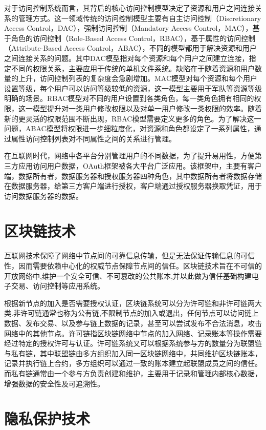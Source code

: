 对于访问控制系统而言，其背后的核心访问控制模型决定了资源和用户之间连接关系的管理方式。这一领域传统的访问控制模型主要有自主访问控制（Discretionary Access Control，DAC），强制访问控制（Mandatory Access Control，MAC），基于角色的访问控制（Role-Based Access Control，RBAC），基于属性的访问控制（Attribute-Based Access Control，ABAC），不同的模型都用于解决资源和用户之间连接关系的问题。其中DAC模型指对每个资源和每个用户之间建立连接，指定不同的权限关系，主要应用于传统的单机文件系统。缺陷在于随着资源和用户数量的上升，访问控制列表的复杂度会急剧增加。MAC模型对每个资源和每个用户设置等级，每个用户可以访问等级较低的资源，这一模型主要用于军队等资源等级明确的场景。RBAC模型对不同的用户设置到各类角色，每一类角色拥有相同的权限，这一模型提升对一类用户修改权限以及对单一用户修改一类权限的效率。随着新的更灵活的权限范围不断出现，RBAC模型需要定义更多的角色。为了解决这一问题，ABAC模型将权限进一步细粒度化，对资源和角色都设定了一系列属性，通过属性访问控制列表对不同属性之间的关系进行管理。

在互联网时代，网络中各平台分别管理用户的不同数据，为了提升易用性，方便第三方应用访问用户数据，OAuth框架被各大平台广泛应用。该框架中，主要有客户端，数据所有者，数据服务器和授权服务器四种角色，其中数据所有者将数据存储在数据服务器，给第三方客户端进行授权，客户端通过授权服务器换取凭证，用于访问数据服务器的数据。

\section{区块链技术}

互联网技术保障了网络中节点间的可靠信息传输，但是无法保证传输信息的可信性，因而需要依赖中心化的权威节点保障节点间的信任。区块链技术旨在不可信的开放网络中,维护一个安全可信、不可篡改的公共账本,并以此做为信任基础构建电子交易、访问控制等应用系统。

根据新节点的加入是否需要授权认证，区块链系统可以分为许可链和非许可链两大类.非许可链通常也称为公有链,不限制节点的加入或退出，任何节点可以访问链上数据、发布交易、以及参与链上数据的记录，甚至可以尝试发布不合法消息，攻击网络中的其他节点。许可链指区块链网络中节点的加入网络、记录账本等操作需要经过特定的授权许可与认证。许可链系统又可以根据系统参与方的数量分为联盟链与私有链，其中联盟链由多方组织加入同一区块链网络中，共同维护区块链账本，记录并执行链上合约，多方组织可以通过一致的账本建立起联盟成员之间的信任。而私有链通常由一个参与方负责创建和维护，主要用于记录和管理内部核心数据，增强数据的安全性及可追溯性。

\section{隐私保护技术}

